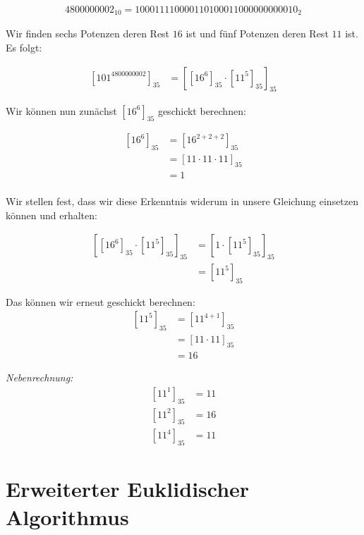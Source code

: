 \documentclass{../crypto}
\begin{document}
\begin{align*}4800000002_{10} = 1 00 01 11 10 00 01 10 10 00 11 00 00 00 00 00 10_2\end{align*}

Wir finden sechs Potenzen deren Rest $16$ ist und fünf Potenzen deren Rest $11$ 
ist. Es folgt:

\begin{align*}
  \left[101^{4800000002}\right]_{35} &= \left[ \left[16^6\right]_{35} 
                                         \cdot \left[11^5\right]_{35}
                                        \right]_{35}
\end{align*}

Wir können nun zunächst $\left[16^6\right]_{35}$ geschickt berechnen:

\begin{align*}
  \left[16^6\right]_{35} &= \left[16^{2+2+2}\right]_{35} \\
                         &= \left[11 \cdot 11 \cdot 11\right]_{35} \\
                         &= 1 \\
\end{align*}

Wir stellen fest, dass wir diese Erkenntnis widerum in unsere Gleichung 
einsetzen können und erhalten:

\begin{align*}
  \left[ \left[16^6\right]_{35} \cdot \left[11^5\right]_{35} \right]_{35} 
                    &= \left[1 \cdot \left[11^5\right]_{35} \right]_{35} \\
                    &= \left[11^5\right]_{35}
\end{align*}

Das können wir erneut geschickt berechnen:
\begin{align*}
  \left[11^{5}\right]_{35} &= \left[11^{4+1}\right]_{35} \\
                           &= \left[11 \cdot 11\right]_{35} \\
                           &= 16
\end{align*}
  
\emph{Nebenrechnung:}
\begin{align*}
  \left[11^{1}\right]_{35} &= 11 \\
  \left[11^{2}\right]_{35} &= 16 \\
  \left[11^{4}\right]_{35} &= 11
\end{align*}

\section{Erweiterter Euklidischer Algorithmus}
\end{document}
